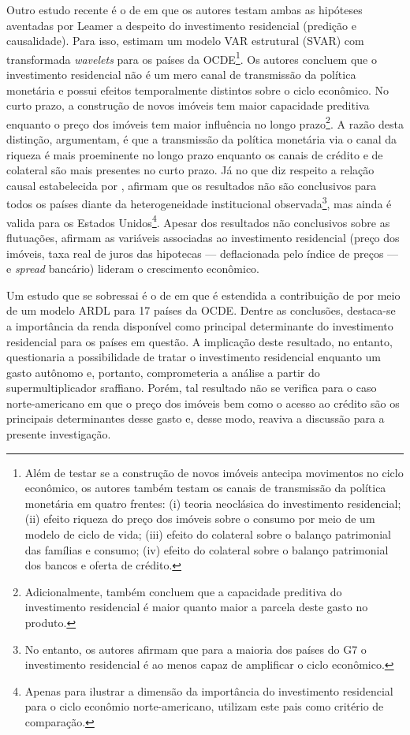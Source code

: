 Outro estudo recente é o de \textcite{huang_is_2018} em que os autores testam ambas as hipóteses aventadas por Leamer a despeito do investimento residencial (predição e causalidade). Para isso, estimam um modelo VAR estrutural (SVAR) com transformada \textit{wavelets} para os países da OCDE\footnote{
	Além de testar se a construção de novos imóveis antecipa movimentos no ciclo econômico, os autores também testam os canais de transmissão da política monetária em quatro frentes: (i) teoria neoclásica do investimento residencial; (ii) efeito riqueza do preço dos imóveis sobre o consumo por meio de um modelo de ciclo de vida; (iii) efeito do colateral sobre o balanço patrimonial das famílias e consumo; (iv) efeito do colateral sobre o balanço patrimonial dos bancos e oferta de crédito.}.  
Os autores concluem que o investimento residencial não é um mero canal de transmissão da política monetária e possui efeitos temporalmente distintos sobre o ciclo econômico. No curto prazo, a construção de novos imóveis tem maior capacidade preditiva enquanto o preço dos imóveis tem maior influência no longo prazo\footnote{Adicionalmente, \textcite{huang_is_2018} também concluem que a capacidade preditiva do investimento residencial é maior quanto maior a parcela deste gasto no produto.}. A razão desta distinção, argumentam, é que a transmissão da política monetária via o canal da riqueza é mais proeminente no longo prazo enquanto os canais de crédito e de colateral são mais presentes no curto prazo. Já no que diz respeito a relação causal estabelecida por \textcite{leamer_housing_2007}, afirmam que os resultados não são conclusivos para todos os países diante da heterogeneidade institucional observada\footnote{
	No entanto, os autores afirmam que para a maioria dos países do G7 o investimento residencial é ao menos capaz de amplificar o ciclo econômico.}, mas ainda é valida para os Estados Unidos\footnote{
	Apenas para ilustrar a dimensão da importância do investimento residencial para o ciclo econômio norte-americano, \textcite{huang_is_2018} utilizam este pais como critério de comparação.}.
Apesar dos resultados não conclusivos sobre as flutuações, afirmam as variáveis associadas ao investimento residencial (preço dos imóveis, taxa real de juros das hipotecas --- deflacionada pelo índice de preços --- e \textit{spread} bancário) lideram o crescimento econômico.



Um estudo que se sobressai é o de \textcite{arestis_residential_2015} em que é estendida a contribuição de \textcite{poterba_tax_1984} por meio de um modelo ARDL para 17 países da OCDE. Dentre as conclusões, destaca-se a importância da renda disponível como principal determinante do investimento residencial para os países em questão.  A implicação deste resultado, no entanto, questionaria a possibilidade de tratar o investimento residencial enquanto um gasto autônomo e, portanto, comprometeria a análise a partir do supermultiplicador sraffiano. Porém, tal resultado não se verifica para o caso norte-americano em que o preço dos imóveis bem como o acesso ao crédito são os principais determinantes desse gasto e, desse modo, reaviva a discussão para a presente investigação.

